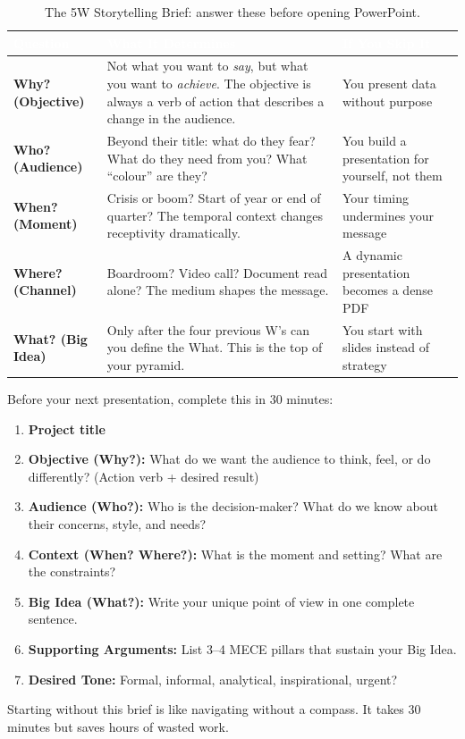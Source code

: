 \begin{table}[H]
\centering
\small
{}
\begin{tabularx}{\textwidth}{>{\bfseries\color{heading}}p{2.5cm} >{\raggedright}X >{\raggedright\arraybackslash}p{4cm}}
\toprule
\rowcolor{tableheader}
\textcolor{white}{\textbf{Question}} & \textcolor{white}{\textbf{What It Determines}} & \textcolor{white}{\textbf{If You Skip It}} \\
\midrule
Why? (Objective) & Not what you want to \emph{say}, but what you want to \emph{achieve}. The objective is always a verb of action that describes a change in the audience. & You present data without purpose \\
Who? (Audience) & Beyond their title: what do they fear? What do they need from you? What ``colour'' are they? & You build a presentation for yourself, not them \\
When? (Moment) & Crisis or boom? Start of year or end of quarter? The temporal context changes receptivity dramatically. & Your timing undermines your message \\
Where? (Channel) & Boardroom? Video call? Document read alone? The medium shapes the message. & A dynamic presentation becomes a dense PDF \\
What? (Big Idea) & Only after the four previous W's can you define the What. This is the top of your pyramid. & You start with slides instead of strategy \\
\bottomrule
\end{tabularx}
\caption{The 5W Storytelling Brief: answer these before opening PowerPoint.}
\end{table}


\begin{keybox}
Before your next presentation, complete this in 30 minutes:
\begin{enumerate}
  \item \textbf{Project title}
  \item \textbf{Objective (Why?):} What do we want the audience to think, feel, or do differently? (Action verb + desired result)
  \item \textbf{Audience (Who?):} Who is the decision-maker? What do we know about their concerns, style, and needs?
  \item \textbf{Context (When? Where?):} What is the moment and setting? What are the constraints?
  \item \textbf{Big Idea (What?):} Write your unique point of view in one complete sentence.
  \item \textbf{Supporting Arguments:} List 3--4 MECE pillars that sustain your Big Idea.
  \item \textbf{Desired Tone:} Formal, informal, analytical, inspirational, urgent?
\end{enumerate}
Starting without this brief is like navigating without a compass. It takes 30 minutes but saves hours of wasted work.
\end{keybox}

